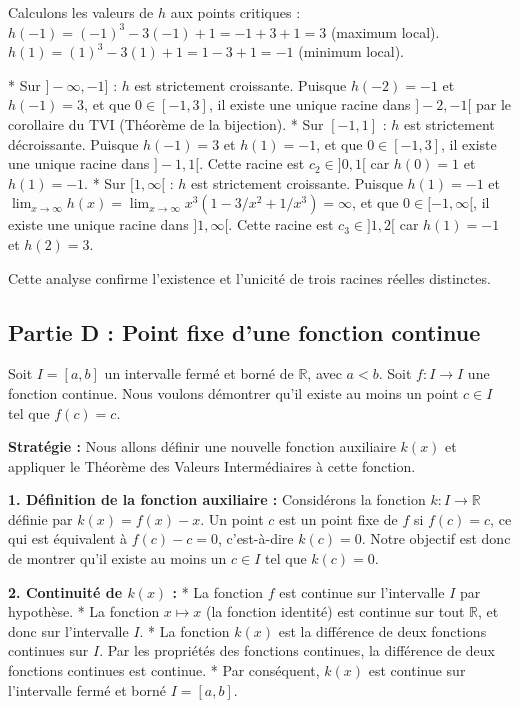 \documentclass[12pt,a4paper]{report}
\begin{document}
Calculons les valeurs de $h$ aux points critiques :
$h(-1) = (-1)^3 - 3(-1) + 1 = -1 + 3 + 1 = 3$ (maximum local).
$h(1) = (1)^3 - 3(1) + 1 = 1 - 3 + 1 = -1$ (minimum local).

*   Sur $]-\infty, -1]$ : $h$ est strictement croissante. Puisque $h(-2) = -1$ et $h(-1) = 3$, et que $0 \in [-1, 3]$, il existe une unique racine dans $]-2, -1[$ par le corollaire du TVI (Théorème de la bijection).
*   Sur $[-1, 1]$ : $h$ est strictement décroissante. Puisque $h(-1) = 3$ et $h(1) = -1$, et que $0 \in [-1, 3]$, il existe une unique racine dans $]-1, 1[$. Cette racine est $c_2 \in ]0, 1[$ car $h(0)=1$ et $h(1)=-1$.
*   Sur $[1, \infty[$ : $h$ est strictement croissante. Puisque $h(1) = -1$ et $\lim_{x \to \infty} h(x) = \lim_{x \to \infty} x^3(1 - 3/x^2 + 1/x^3) = \infty$, et que $0 \in [-1, \infty[$, il existe une unique racine dans $]1, \infty[$. Cette racine est $c_3 \in ]1, 2[$ car $h(1)=-1$ et $h(2)=3$.

Cette analyse confirme l'existence et l'unicité de trois racines réelles distinctes.

\subsection{Partie D : Point fixe d'une fonction continue}

Soit $I = [a, b]$ un intervalle fermé et borné de $\mathbb{R}$, avec $a < b$. Soit $f: I \to I$ une fonction continue.
Nous voulons démontrer qu'il existe au moins un point $c \in I$ tel que $f(c) = c$.

\textbf{Stratégie :}
Nous allons définir une nouvelle fonction auxiliaire $k(x)$ et appliquer le Théorème des Valeurs Intermédiaires à cette fonction.

\textbf{1. Définition de la fonction auxiliaire :}
Considérons la fonction $k: I \to \mathbb{R}$ définie par $k(x) = f(x) - x$.
Un point $c$ est un point fixe de $f$ si $f(c) = c$, ce qui est équivalent à $f(c) - c = 0$, c'est-à-dire $k(c) = 0$.
Notre objectif est donc de montrer qu'il existe au moins un $c \in I$ tel que $k(c) = 0$.

\textbf{2. Continuité de $k(x)$ :}
*   La fonction $f$ est continue sur l'intervalle $I$ par hypothèse.
*   La fonction $x \mapsto x$ (la fonction identité) est continue sur tout $\mathbb{R}$, et donc sur l'intervalle $I$.
*   La fonction $k(x)$ est la différence de deux fonctions continues sur $I$. Par les propriétés des fonctions continues, la différence de deux fonctions continues est continue.
*   Par conséquent, $k(x)$ est continue sur l'intervalle fermé et borné $I = [a, b]$.
\end{document}

